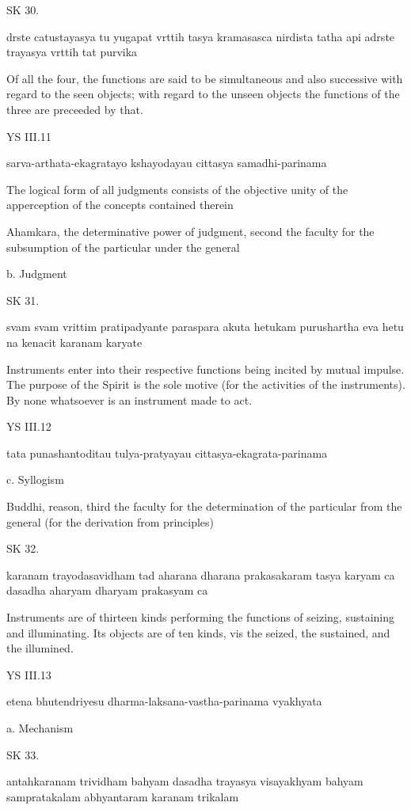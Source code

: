 SK 30.

drste catustayasya tu yugapat vrttih tasya kramasasca nirdista
tatha api adrste trayasya vrttih tat purvika

Of all the four, the functions are said to be simultaneous and also successive
with regard to the seen objects;
with regard to the unseen objects
the functions of the three are preceeded by that.

YS III.11

    sarva-arthata-ekagratayo kshayodayau cittasya samadhi-parinama

    The logical form of all judgments consists of the objective unity of the apperception of the concepts contained therein

    Ahamkara, the determinative power of judgment, second the faculty for the subsumption of the particular under the general

    b. Judgment

SK 31.

svam svam vrittim pratipadyante paraspara akuta hetukam
purushartha eva hetu na kenacit karanam karyate

Instruments enter into their respective functions being incited by mutual impulse.
The purpose of the Spirit is the sole motive (for the activities of the instruments).
By none whatsoever is an instrument made to act.

YS III.12

    tata punashantoditau tulya-pratyayau cittasya-ekagrata-parinama

    c. Syllogism

    Buddhi, reason, third the faculty for the determination of the particular from the general (for the derivation from principles)

SK 32.

karanam trayodasavidham tad aharana dharana prakasakaram
tasya karyam ca dasadha aharyam dharyam prakasyam ca

Instruments are of thirteen kinds performing the functions of
seizing, sustaining and illuminating.
Its objects are of ten kinds, vis
the seized, the sustained, and the illumined.

YS III.13

    etena bhutendriyesu dharma-laksana-vastha-parinama vyakhyata

    a. Mechanism

SK 33.

antahkaranam trividham bahyam dasadha trayasya visayakhyam
bahyam sampratakalam abhyantaram karanam trikalam

